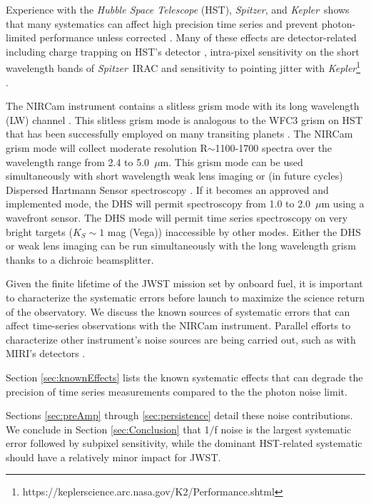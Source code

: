 \documentclass[]{aastex62}
\newcommand{\spitzer}{{\it Spitzer}}
\newcommand{\kepler}{{\it Kepler}}
\begin{document}
Experience with the \textit{Hubble Space Telescope} (HST), \spitzer, and \kepler\ shows that many systematics can affect high precision time series and prevent photon-limited performance unless corrected \citep[e.g.][]{beichman2014pasp}.
Many of these effects are detector-related including charge trapping on HST's detector \citep{berta2012flat_gj1214,zhou2017chargeTrap}, intra-pixel sensitivity on the short wavelength bands of \spitzer\ IRAC \citep{moralesCalderon2006LdwarfsWeatherIPC} and sensitivity to pointing jitter with \kepler\footnote{https://keplerscience.arc.nasa.gov/K2/Performance.shtml} \citep[e.g.][]{vanderburg2014twoWheeledKeplerPhot,beichman2014pasp}.

The NIRCam instrument \citep{rieke2005nircamSPIE} contains a slitless grism mode with its long wavelength (LW) channel \citep{greene2017jatisNIRCam}.
This slitless grism mode is analogous to the WFC3 grism on HST that has been successfully employed on many transiting planets \citep[e.g.][]{deming13,kreidberg2014wasp43,sing2016continuum,wakeford2017hatp26}.
The NIRCam grism mode will collect moderate resolution R$\sim$1100-1700 spectra over the wavelength range from 2.4 to 5.0~$\mu$m.
This grism mode can be used simultaneously with short wavelength weak lens imaging or (in future cycles) Dispersed Hartmann Sensor spectroscopy \citep{schlawin2017dhs}. If it becomes an approved and implemented mode, the DHS will permit spectroscopy from 1.0 to 2.0~$\mu$m using a wavefront sensor.
The DHS mode will permit time series spectroscopy on very bright targets ($K_S \sim 1$ mag (Vega)) inaccessible by other modes.
Either the DHS or weak lens imaging can be run simultaneously with the long wavelength grism thanks to a dichroic beamsplitter.

Given the finite lifetime of the JWST mission set by onboard fuel, it is important to characterize the systematic errors before launch to maximize the science return of the observatory.
We discuss the known sources of systematic errors that can affect time-series observations with the NIRCam instrument.
Parallel efforts to characterize other instrument's noise sources are being carried out, such as with MIRI's detectors \citep{matuso2019siAsDetectorStability}.

Section \ref{sec:knownEffects} lists the known systematic effects that can degrade the precision of time series measurements compared to the the photon noise limit.

Sections \ref{sec:preAmp} through \ref{sec:persistence} detail these noise contributions.
We conclude in Section \ref{sec:Conclusion} that 1/f noise is the largest systematic error followed by subpixel sensitivity, while the dominant HST-related systematic should have a relatively minor impact for JWST.
\end{document}
